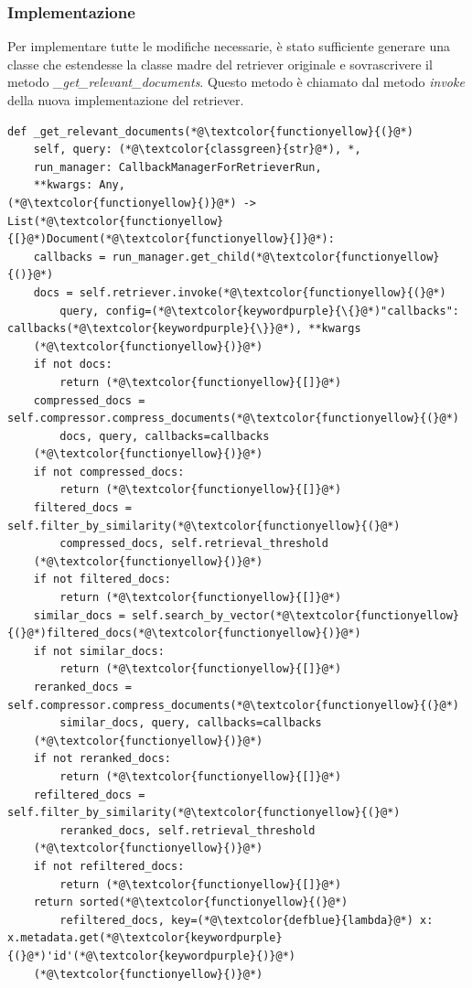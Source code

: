 \subsubsection{Implementazione}
Per implementare tutte le modifiche necessarie, è stato sufficiente generare una classe che estendesse la classe madre del retriever originale e sovrascrivere il metodo \textit{\_get\_relevant\_documents}. Questo metodo è chiamato dal metodo \textit{invoke} della nuova implementazione del retriever.
\begin{lstlisting}[label=lst:rerank, caption={Override del metodo di ricerca del retriever}]
def _get_relevant_documents(*@\textcolor{functionyellow}{(}@*)
    self, query: (*@\textcolor{classgreen}{str}@*), *,
    run_manager: CallbackManagerForRetrieverRun,
    **kwargs: Any,
(*@\textcolor{functionyellow}{)}@*) -> List(*@\textcolor{functionyellow}{[}@*)Document(*@\textcolor{functionyellow}{]}@*):
    callbacks = run_manager.get_child(*@\textcolor{functionyellow}{()}@*)
    docs = self.retriever.invoke(*@\textcolor{functionyellow}{(}@*)
        query, config=(*@\textcolor{keywordpurple}{\{}@*)"callbacks": callbacks(*@\textcolor{keywordpurple}{\}}@*), **kwargs
    (*@\textcolor{functionyellow}{)}@*)
    if not docs:
        return (*@\textcolor{functionyellow}{[]}@*)
    compressed_docs = self.compressor.compress_documents(*@\textcolor{functionyellow}{(}@*)
        docs, query, callbacks=callbacks
    (*@\textcolor{functionyellow}{)}@*)
    if not compressed_docs:
        return (*@\textcolor{functionyellow}{[]}@*)
    filtered_docs = self.filter_by_similarity(*@\textcolor{functionyellow}{(}@*)
        compressed_docs, self.retrieval_threshold
    (*@\textcolor{functionyellow}{)}@*)
    if not filtered_docs:
        return (*@\textcolor{functionyellow}{[]}@*)
    similar_docs = self.search_by_vector(*@\textcolor{functionyellow}{(}@*)filtered_docs(*@\textcolor{functionyellow}{)}@*)
    if not similar_docs:
        return (*@\textcolor{functionyellow}{[]}@*)
    reranked_docs = self.compressor.compress_documents(*@\textcolor{functionyellow}{(}@*)
        similar_docs, query, callbacks=callbacks
    (*@\textcolor{functionyellow}{)}@*)
    if not reranked_docs:
        return (*@\textcolor{functionyellow}{[]}@*)
    refiltered_docs = self.filter_by_similarity(*@\textcolor{functionyellow}{(}@*)
        reranked_docs, self.retrieval_threshold
    (*@\textcolor{functionyellow}{)}@*)
    if not refiltered_docs:
        return (*@\textcolor{functionyellow}{[]}@*)
    return sorted(*@\textcolor{functionyellow}{(}@*)
        refiltered_docs, key=(*@\textcolor{defblue}{lambda}@*) x: x.metadata.get(*@\textcolor{keywordpurple}{(}@*)'id'(*@\textcolor{keywordpurple}{)}@*)
    (*@\textcolor{functionyellow}{)}@*)
\end{lstlisting}
